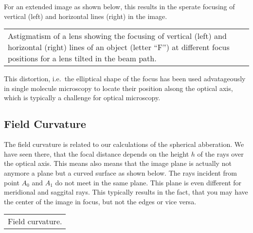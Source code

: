 \documentclass[letterpaper,10pt,english]{sphinxmanual}
\begin{document}
For an extended image as shown below, this results in the sperate focusing of vertical (left) and horizontal lines (right) in the image.


\begin{savenotes}\sphinxattablestart
\centering
\begin{tabulary}{\linewidth}[t]{|T|}
\hline
\sphinxstyletheadfamily 
{}  
\\
\hline
{} Astigmatism of a lens showing the focusing of vertical (left) and horizontal (right) lines of an object (letter “F”) at different focus positions for a lens tilted in the beam path.
\\
\hline
\end{tabulary}
\par
\sphinxattableend\end{savenotes}

This distortion, i.e. the elliptical shape of the focus has been used advatageously in single molecule microscopy to locate their position alsong the optical axis, which is typically a challenge for optical microscopy.


\subsection{Field Curvature}
\label{\detokenize{notebooks/L7/Imaging Errors:Field-Curvature}}
The field curvature is related to our calculations of the spherical abberation. We have seen there, that the focal distance depends on the height \(h\) of the rays over the optical axis. This means also means that the image plane is actually not anymore a plane but a curved surface as shown below. The rays incident from point \(A_0\) and \(A_1\) do not meet in the same plane. This plane is even different for meridional and saggital rays. This typically results in the fact, that you
may have the center of the image in focus, but not the edges or vice versa.


\begin{savenotes}\sphinxattablestart
\centering
\begin{tabulary}{\linewidth}[t]{|T|}
\hline
\sphinxstyletheadfamily 
{} 
\\
\hline
{} Field curvature.
\\
\hline
\end{tabulary}
\par
\sphinxattableend\end{savenotes}
\end{document}
